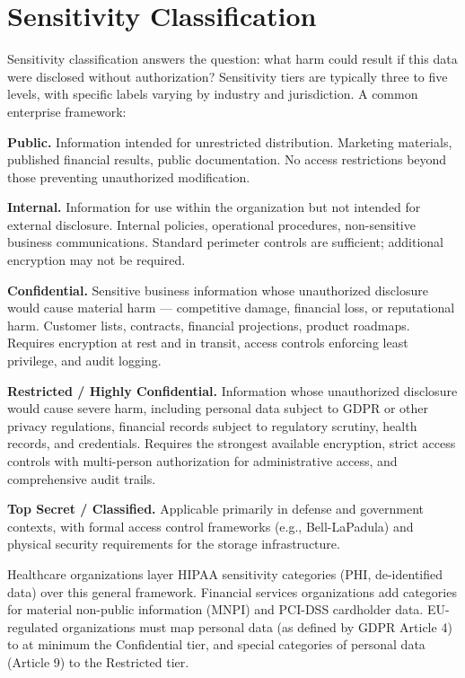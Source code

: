 \section{Sensitivity Classification}
Sensitivity classification answers the question: what harm could result if this data were disclosed without authorization? Sensitivity tiers are typically three to five levels, with specific labels varying by industry and jurisdiction. A common enterprise framework:

\textbf{Public.} Information intended for unrestricted distribution. Marketing materials, published financial results, public documentation. No access restrictions beyond those preventing unauthorized modification.

\textbf{Internal.} Information for use within the organization but not intended for external disclosure. Internal policies, operational procedures, non-sensitive business communications. Standard perimeter controls are sufficient; additional encryption may not be required.

\textbf{Confidential.} Sensitive business information whose unauthorized disclosure would cause material harm --- competitive damage, financial loss, or reputational harm. Customer lists, contracts, financial projections, product roadmaps. Requires encryption at rest and in transit, access controls enforcing least privilege, and audit logging.

\textbf{Restricted / Highly Confidential.} Information whose unauthorized disclosure would cause severe harm, including personal data subject to GDPR or other privacy regulations, financial records subject to regulatory scrutiny, health records, and credentials. Requires the strongest available encryption, strict access controls with multi-person authorization for administrative access, and comprehensive audit trails.

\textbf{Top Secret / Classified.} Applicable primarily in defense and government contexts, with formal access control frameworks (e.g., Bell-LaPadula) and physical security requirements for the storage infrastructure.

Healthcare organizations layer HIPAA sensitivity categories (PHI, de-identified data) over this general framework. Financial services organizations add categories for material non-public information (MNPI) and PCI-DSS cardholder data. EU-regulated organizations must map personal data (as defined by GDPR Article 4) to at minimum the Confidential tier, and special categories of personal data (Article 9) to the Restricted tier.


